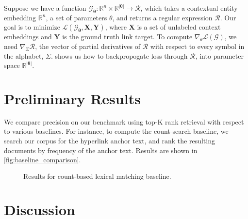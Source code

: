 \documentclass{article}
\begin{document}
Suppose we have a function $\mathcal G_{\mathbf \theta}: \mathbb{R}^n \times \mathbb{R}^{|\mathbf \theta|} \rightarrow \mathcal R$, which takes a contextual entity embedding $\mathbb R^n$, a set of parameters $\theta$, and returns a regular expression $\mathcal R$. Our goal is to minimize $\mathcal L(\mathcal G_{\mathbf \theta}, \mathbf X, \mathbf Y)$, where $\mathbf X$ is a set of unlabeled context embeddings and $\mathbf Y$ is the ground truth link target. To compute $\nabla_\theta \mathcal L(\mathcal G)$, we need $\nabla_\Sigma \mathcal R$, the vector of partial derivatives of $\mathcal R$ with respect to every symbol in the alphabet, $\Sigma$. \citet{brzozowski1964derivatives} shows us how to backpropogate loss through $\mathcal R$, into parameter space $\mathbb{R}^{|\mathbf \theta|}$.

\section{Preliminary Results}

We compare precision on our benchmark using top-K rank retrieval with respect to various baselines. For instance, to compute the count-search baseline, we search our corpus for the hyperlink anchor text, and rank the resulting documents by frequency of the anchor text. Results are shown in \autoref{fig:baseline_comparison}.

\begin{figure}[H]
\centering
{}
\caption{Results for count-based lexical matching baseline.}
\label{fig:baseline_comparison}
\end{figure}

\section{Discussion}
\end{document}
